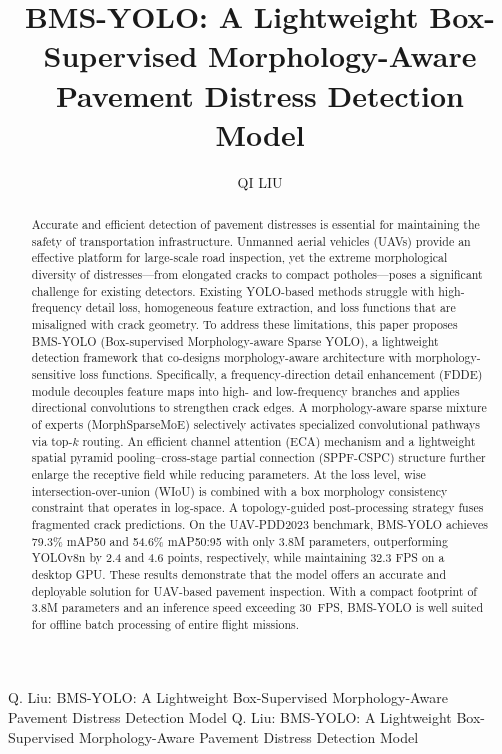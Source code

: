 \documentclass{ieeeaccess}
\begin{document}

\title{BMS-YOLO: A Lightweight Box-Supervised Morphology-Aware Pavement Distress Detection Model}

\author{\uppercase{Qi Liu}}
\address[1]{College of Big Data and Intelligent Engineering, Yangtze Normal University, Chongqing 408000, China (e-mail: 17837248232@163.com)}

\markboth
{Q. Liu: BMS-YOLO: A Lightweight Box-Supervised Morphology-Aware Pavement Distress Detection Model}
{Q. Liu: BMS-YOLO: A Lightweight Box-Supervised Morphology-Aware Pavement Distress Detection Model}


\begin{abstract}
Accurate and efficient detection of pavement distresses is essential for maintaining the safety of transportation infrastructure. Unmanned aerial vehicles (UAVs) provide an effective platform for large-scale road inspection, yet the extreme morphological diversity of distresses---from elongated cracks to compact potholes---poses a significant challenge for existing detectors. Existing YOLO-based methods struggle with high-frequency detail loss, homogeneous feature extraction, and loss functions that are misaligned with crack geometry. To address these limitations, this paper proposes BMS-YOLO (Box-supervised Morphology-aware Sparse YOLO), a lightweight detection framework that co-designs morphology-aware architecture with morphology-sensitive loss functions. Specifically, a frequency-direction detail enhancement (FDDE) module decouples feature maps into high- and low-frequency branches and applies directional convolutions to strengthen crack edges. A morphology-aware sparse mixture of experts (MorphSparseMoE) selectively activates specialized convolutional pathways via top-$k$ routing. An efficient channel attention (ECA) mechanism and a lightweight spatial pyramid pooling--cross-stage partial connection (SPPF-CSPC) structure further enlarge the receptive field while reducing parameters. At the loss level, wise intersection-over-union (WIoU) is combined with a box morphology consistency constraint that operates in log-space. A topology-guided post-processing strategy fuses fragmented crack predictions. On the UAV-PDD2023 benchmark, BMS-YOLO achieves 79.3\% mAP50 and 54.6\% mAP50:95 with only 3.8M parameters, outperforming YOLOv8n by 2.4 and 4.6 points, respectively, while maintaining 32.3 FPS on a desktop GPU. These results demonstrate that the model offers an accurate and deployable solution for UAV-based pavement inspection. With a compact footprint of 3.8M parameters and an inference speed exceeding 30~FPS, BMS-YOLO is well suited for offline batch processing of entire flight missions.
\end{abstract}
\end{document}
